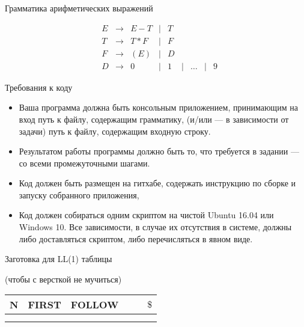 \documentclass[12pt]{article}
\begin{document}
\bigskip

\begin{center} Грамматика арифметических выражений \end{center}

    $$
    \begin{array}{cccccccccc}
       &E & \rightarrow & E - T & \mid & T \\
       &T & \rightarrow & T * F & \mid & F \\
       &F & \rightarrow & ( E ) & \mid & D \\
       &D & \rightarrow & 0     & \mid & 1 & \mid & \dots & \mid & 9
    \end{array}
    $$

\newpage

\begin{center} Требования к коду \end{center}
\begin{itemize}
\item Ваша программа должна быть консольным приложением, принимающим на вход путь к файлу, содержащим грамматику, (и/или --- в зависимости от задачи) путь к файлу, содержащим входную строку. 
\item Результатом работы программы должно быть то, что требуется в задании --- со всеми промежуточными шагами. 
\item Код должен быть размещен на гитхабе, содержать инструкцию по сборке и запуску собранного приложения, 
\item Код должен собираться одним скриптом на чистой Ubuntu 16.04 или Windows 10. Все зависимости, в случае их отсутствия в системе, должны либо доставляться скриптом, либо перечисляться в явном виде.
\end{itemize}

\bigskip

\begin{center} Заготовка для LL(1) таблицы

(чтобы с версткой не мучиться)
\end{center}
\begin{center}
\begin{tabular}{ l || c | c || c | c | r }
  N & FIRST & FOLLOW &  &  & $ \$ $ \\ \hline  
    &       &        &  &  & \\ 
    &       &        &  &  & 

\end{tabular}  
\end{center}


\end{document}
